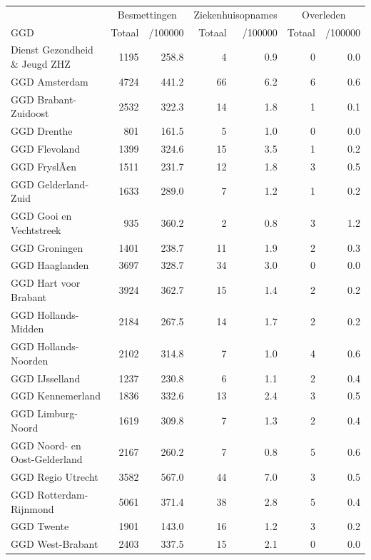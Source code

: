 \documentclass[
  english,
  man,floatsintext]{apa6}
\begin{document}
\begin{table}
\centering\begingroup\fontsize{10}{12}\selectfont

\begin{threeparttable}
\begin{tabular}{lrrrrrr}
\toprule
\multicolumn{1}{c}{ } & \multicolumn{2}{c}{Besmettingen} & \multicolumn{2}{c}{Ziekenhuisopnames} & \multicolumn{2}{c}{Overleden} \\
\cmidrule(l{3pt}r{3pt}){2-3} \cmidrule(l{3pt}r{3pt}){4-5} \cmidrule(l{3pt}r{3pt}){6-7}
GGD & Totaal & /100000 & Totaal & /100000 & Totaal & /100000\\
\midrule
Dienst Gezondheid \& Jeugd ZHZ & 1195 & 258.8 & 4 & 0.9 & 0 & 0.0\\
GGD Amsterdam & 4724 & 441.2 & 66 & 6.2 & 6 & 0.6\\
GGD Brabant-Zuidoost & 2532 & 322.3 & 14 & 1.8 & 1 & 0.1\\
GGD Drenthe & 801 & 161.5 & 5 & 1.0 & 0 & 0.0\\
GGD Flevoland & 1399 & 324.6 & 15 & 3.5 & 1 & 0.2\\
GGD FryslÃ¢n & 1511 & 231.7 & 12 & 1.8 & 3 & 0.5\\
GGD Gelderland-Zuid & 1633 & 289.0 & 7 & 1.2 & 1 & 0.2\\
GGD Gooi en Vechtstreek & 935 & 360.2 & 2 & 0.8 & 3 & 1.2\\
GGD Groningen & 1401 & 238.7 & 11 & 1.9 & 2 & 0.3\\
GGD Haaglanden & 3697 & 328.7 & 34 & 3.0 & 0 & 0.0\\
GGD Hart voor Brabant & 3924 & 362.7 & 15 & 1.4 & 2 & 0.2\\
GGD Hollands-Midden & 2184 & 267.5 & 14 & 1.7 & 2 & 0.2\\
GGD Hollands-Noorden & 2102 & 314.8 & 7 & 1.0 & 4 & 0.6\\
GGD IJsselland & 1237 & 230.8 & 6 & 1.1 & 2 & 0.4\\
GGD Kennemerland & 1836 & 332.6 & 13 & 2.4 & 3 & 0.5\\
GGD Limburg-Noord & 1619 & 309.8 & 7 & 1.3 & 2 & 0.4\\
GGD Noord- en Oost-Gelderland & 2167 & 260.2 & 7 & 0.8 & 5 & 0.6\\
GGD Regio Utrecht & 3582 & 567.0 & 44 & 7.0 & 3 & 0.5\\
GGD Rotterdam-Rijnmond & 5061 & 371.4 & 38 & 2.8 & 5 & 0.4\\
GGD Twente & 1901 & 143.0 & 16 & 1.2 & 3 & 0.2\\
GGD West-Brabant & 2403 & 337.5 & 15 & 2.1 & 0 & 0.0\\

\end{tabular}
\end{threeparttable}
\end{table}
\end{document}
